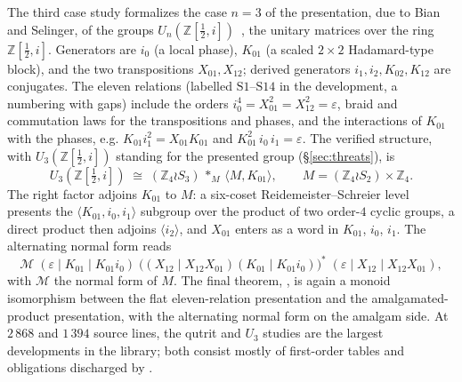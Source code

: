 The third case study formalizes the case $n = 3$ of the presentation, due
to Bian and Selinger, of the groups
$U_n(\mathbb{Z}[\tfrac12,i])$~\cite{bian2021un}, the unitary matrices over
the ring $\mathbb{Z}[\tfrac12,i]$.
Generators are $i_0$ (a local phase), $K_{01}$ (a scaled $2{\times}2$
Hadamard-type block), and the two transpositions $X_{01}, X_{12}$;
derived generators $i_1, i_2, K_{02}, K_{12}$ are conjugates.  The eleven
relations (labelled $\mathrm{S1}$--$\mathrm{S14}$ in the development, a
numbering with gaps) include the orders $i_0^4 = X_{01}^2 = X_{12}^2 =
\varepsilon$, braid and commutation laws for the transpositions and
phases, and the interactions of $K_{01}$ with the
phases, e.g.
$K_{01} i_1^2 = X_{01} K_{01}$ and
$K_{01}^2\, i_0\, i_1 = \varepsilon$.  The verified structure, with
$U_3(\mathbb{Z}[\tfrac12,i])$ standing for the presented group
(\S\ref{sec:threats}), is
\[
  U_3(\mathbb{Z}[\tfrac12,i]) \;\cong\;
  (\mathbb{Z}_4 \wr S_3) \,\ast_{M}\, \langle M, K_{01} \rangle,
  \qquad M = (\mathbb{Z}_4 \wr S_2) \times \mathbb{Z}_4 .
\]
The right factor adjoins
$K_{01}$ to $M$: a six-coset Reidemeister--Schreier level presents
the $\langle K_{01}, i_0, i_1 \rangle$ subgroup over the product
of two order-$4$ cyclic groups, a direct product then adjoins
$\langle i_2 \rangle$, and $X_{01}$ enters as a word in $K_{01}$, $i_0$,
$i_1$.  The alternating normal form reads
\[
  \mathcal{M}\;(\varepsilon \mid K_{01} \mid K_{01} i_0)\;
  \bigl((X_{12} \mid X_{12}X_{01})(K_{01} \mid K_{01} i_0)\bigr)^{*}\;
  (\varepsilon \mid X_{12} \mid X_{12}X_{01}),
\]
with $\mathcal{M}$ the normal form of $M$.
The final theorem,
, is again a monoid isomorphism between
the flat eleven-relation presentation and the amalgamated-product
presentation, with the alternating normal form on the amalgam side.  At
$2\,868$ and $1\,394$ source lines, the qutrit and $U_3$ studies are the
largest developments in the library; both consist mostly of
first-order tables and obligations discharged by .
